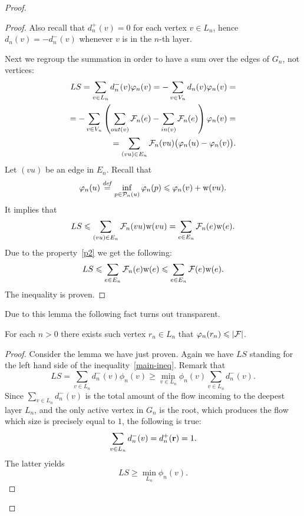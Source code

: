 \documentclass[12pt]{amsart}
\begin{document}
\begin{proof}
\begin{proof}
        Also recall that $d_n^{+}(v) = 0$ for each vertex $v \in L_n$, hence $d_n(v) = -d_n^{-}(v)$ whenever $v$ is in the $n$-th layer.

        Next we regroup the summation in order to have a sum over the edges of $G_n$, not vertices:
        \begin{align*}
          LS = \sum\limits_{v \in L_n} d_n^{-}(v) \varphi_n(v) = -\sum\limits_{v \in V_n} d_n(v) \varphi_n(v) =\\
          =-\sum_{v \in V_n} \left(\sum_{out(v)} \mathcal{F}_{n}(e) - \sum_{in(v)}\mathcal{F}_{n}(e) \right) \varphi_n(v)=\\
          =\sum_{(vu) \in E_n} \mathcal{F}_{n}(vu) \big(\varphi_n(u) - \varphi_n(v)\big).
        \end{align*}
        Let $(vu)$ be an edge in $E_n$. Recall that
        \[
          \varphi_n(u) \overset{\mathit{def}}{=} \inf_{p \in \mathcal{P}_n(u)} \varphi_n(p) \leqslant \varphi_n(v) + \mathrm{w}(vu).
        \]
        It implies that
        \[
          LS\leqslant \sum_{(vu) \in E_n} \mathcal{F}_{n}(vu) \mathrm{w}(vu) = \sum_{e \in E_n} \mathcal{F}_{n}(e) \mathrm{w}(e).
        \]
        Due to the property~\ref{p2} we get the following:
        \[
          LS\leqslant \sum_{e \in E_n} \mathcal{F}_{n}(e) \mathrm{w}(e) \leqslant \sum_{e \in E_n} \mathcal{F}(e) \mathrm{w}(e).
        \]
        The inequality is proven.
      \end{proof}
      Due to this lemma the following fact turns out transparent.
      \begin{prop}
        For each $n > 0$ there exists such vertex $r_n \in L_n$ that $\varphi_n(r_n) \leqslant \lvert\mathcal{F}\rvert$.
      \end{prop}
      \begin{proof}
        Consider the lemma we have just proven.
        Again we have $LS$ standing for the left hand side of the inequality~\eqref{main-ineq}.
        Remark that
        \[
          LS = \sum_{v \in L_n}d^{-}_n(v) \phi_n(v) \geq \min_{v \in L_n}\phi_n(v) \sum_{v \in L_n} d^{-}_n(v).
        \]
        Since $\sum\limits_{v \in L_n} d^{-}_n(v)$ is the total amount of the flow incoming to the deepest layer $L_n$, and the only
          active vertex in $G_n$ is the root, which produces the flow which size is precisely equal to $1$, the following is true:
        \[
          \sum_{v \in L_n} d^{-}_n(v) = d^{+}_n(\mathbf{r}) = 1.
        \]
        The latter yields
        \[
          LS \geq \min_{L_n} \phi_n(v).
        \]


\end{proof}
\end{proof}
\end{document}

